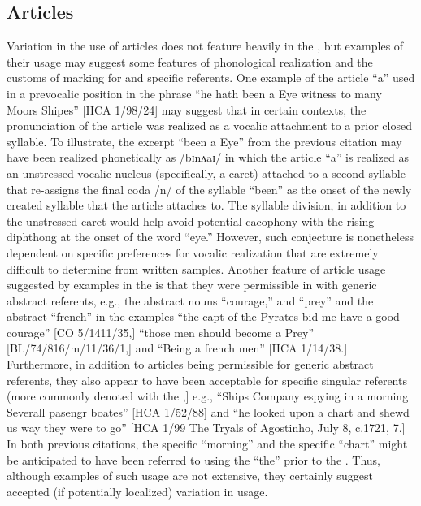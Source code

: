 \subsection{{Articles}}%

Variation in the use of  articles does not feature heavily in the , but examples of their usage may suggest some features of phonological realization and the customs of marking for  and specific referents. One example of the  article “a” used in a prevocalic position in the phrase “he hath been a Eye witness to many Moors Shipes” [HCA 1/98/24] may suggest that in certain contexts, the pronunciation of the article was realized as a vocalic attachment to a prior closed syllable. To illustrate, the excerpt “been a Eye” from the previous citation may have been realized phonetically as /b{ɪ}nʌ{aɪ/ in which the article “a” is realized as an unstressed vocalic nucleus (specifically, a caret) attached to a second syllable that re-assigns the final coda /n/ of the syllable “been” as the onset of the newly created syllable that the article attaches to. The syllable division, in addition to the unstressed caret would help avoid potential cacophony with the rising diphthong at the onset of the word “eye.” However, such conjecture is nonetheless dependent on specific preferences for vocalic realization that are extremely difficult to determine from written samples. Another feature of  article usage suggested by examples in the  is that they were permissible in  with generic abstract referents, e.g., the abstract nouns “courage,” and “prey” and the abstract  “french” in the examples} “the capt of the Pyrates bid me have a good courage” [CO 5/1411/35,] “those men should become a Prey” [BL/74/816/m/11/36/1,] and “Being a french men” [HCA 1/14/38.] Furthermore, in addition to  articles being {permissible for generic abstract referents, they also appear to have been acceptable for specific singular referents (more commonly denoted with the ,] e.g.,} “Ships Company espying in a morning Severall pasengr boates” [HCA 1/52/88] and “he looked upon a chart and shewd us way they were to go” [HCA 1/99 The Tryals of Agostinho, July 8, c.1721, 7.] In both previous citations, the specific “morning” and the specific “chart” might be anticipated to have been referred to using the  “the” prior to the . Thus, although examples of such usage are not extensive, they certainly suggest accepted (if potentially localized) variation in usage. 

